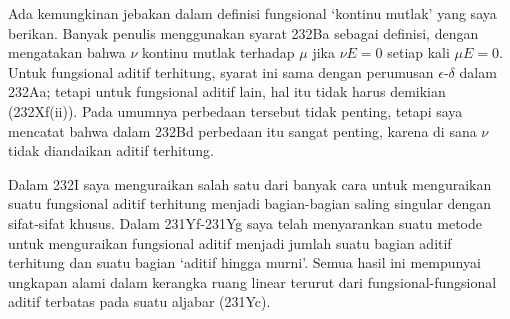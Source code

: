 {Ada kemungkinan jebakan dalam definisi fungsional `kontinu mutlak' yang
saya berikan. Banyak penulis menggunakan syarat 232Ba sebagai definisi,
dengan mengatakan bahwa $\nu$ kontinu mutlak terhadap $\mu$ jika
$\nu E=0$ setiap kali $\mu E=0$. Untuk fungsional aditif terhitung,
syarat ini sama dengan perumusan $\epsilon$-$\delta$ dalam 232Aa; tetapi
untuk fungsional aditif lain, hal itu tidak harus demikian (232Xf(ii)).
Pada umumnya perbedaan tersebut tidak penting, tetapi saya mencatat bahwa
dalam 232Bd perbedaan itu sangat penting, karena di sana $\nu$ tidak
diandaikan aditif terhitung.

Dalam 232I saya menguraikan salah satu dari banyak cara untuk menguraikan
suatu fungsional aditif terhitung menjadi bagian-bagian saling singular
dengan sifat-sifat khusus. Dalam 231Yf-231Yg saya telah menyarankan suatu
metode untuk menguraikan fungsional aditif menjadi jumlah suatu bagian
aditif terhitung dan suatu bagian `aditif hingga murni'. Semua hasil ini
mempunyai ungkapan alami dalam kerangka ruang linear terurut dari
fungsional-fungsional aditif terbatas pada suatu aljabar (231Yc).
}%

\discrpage

